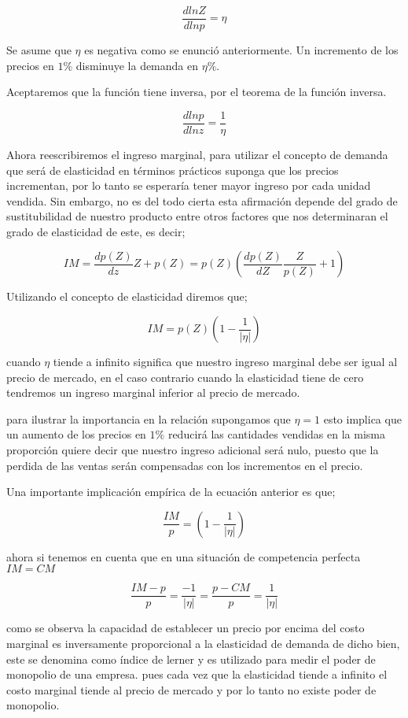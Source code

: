 \documentclass[12pt]{article}
\providecommand{\abs}[1]{\lvert#1\rvert}
\begin{document}
$$\dfrac{dlnZ}{dlnp}=\eta$$

Se asume que $\eta$ es negativa como se enunció anteriormente. Un incremento de los precios en $ 1\%$  disminuye la demanda en $\eta \%.$

Aceptaremos que la función tiene inversa, por el teorema de la función inversa.

$$\dfrac{dlnp}{dlnz}=\dfrac{1}{\eta}$$

Ahora reescribiremos el ingreso marginal, para utilizar el concepto de demanda que será de elasticidad en términos prácticos suponga que los precios incrementan, por lo tanto se esperaría tener mayor ingreso por cada unidad vendida. Sin embargo,  no es del todo cierta esta afirmación depende del grado de sustitubilidad de nuestro producto entre otros factores que nos determinaran el grado de elasticidad de este, es decir;


$$IM= \dfrac{dp(Z)}{dz}Z+p(Z)= p(Z)\left(\dfrac{dp(Z)}{dZ}\dfrac{Z}{p(Z)}+1\right)$$


Utilizando el concepto de elasticidad diremos que;

$$IM=p(Z)\left(1-\dfrac{1}{\abs{\eta}}\right)$$

cuando $\eta$ tiende a infinito significa que nuestro ingreso marginal debe ser igual al precio de mercado, en el caso contrario cuando la elasticidad tiene de cero tendremos un ingreso marginal inferior al precio de mercado.

para ilustrar la importancia en la relación supongamos que $\eta=1$ esto implica que un aumento de los precios en $ 1 \% $ reducirá las cantidades vendidas en la misma proporción quiere decir que nuestro ingreso adicional será nulo, puesto que la perdida de las ventas serán compensadas con los incrementos en el precio.

Una importante implicación empírica de la ecuación anterior es que;

$$ \dfrac{IM}{p}=\left(1-\dfrac{1}{\abs{\eta}}\right)$$

ahora si tenemos en cuenta que en una situación de competencia perfecta $IM=CM$


$$\dfrac{IM-p}{p}=\dfrac{-1}{\abs{\eta}} = \dfrac{p-CM}{p}=\dfrac{1}{\abs{\eta}}$$

como se observa la capacidad de establecer un precio por encima del costo marginal es inversamente proporcional a la elasticidad de demanda de dicho bien, este se denomina como índice de lerner y es utilizado para medir el poder de monopolio de una empresa. pues cada vez que la elasticidad tiende a infinito el costo marginal tiende al precio de mercado y por lo tanto no existe poder de monopolio.
\end{document}
